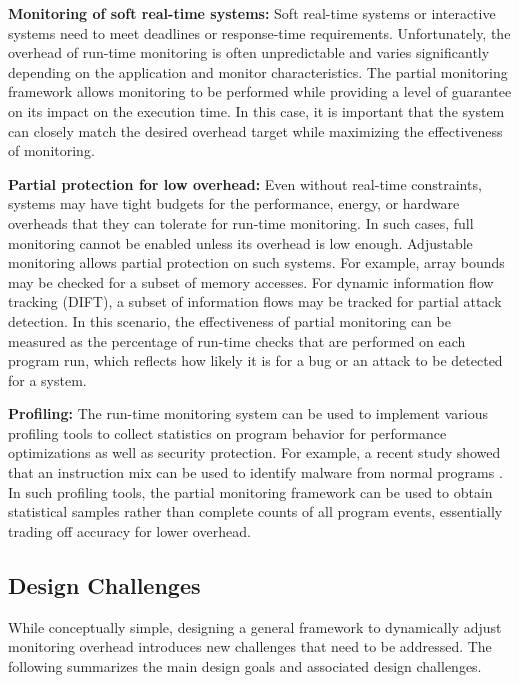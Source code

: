 {\bf Monitoring of soft real-time systems:}
Soft real-time systems or interactive systems need to meet deadlines or
response-time requirements. Unfortunately, the overhead of run-time monitoring
is often unpredictable and varies significantly depending on the application
and monitor characteristics. The partial monitoring framework allows monitoring
to be performed while providing a level of guarantee on its impact on the
execution time.  In this case, it is important that the system can closely
match the desired overhead target while maximizing the effectiveness of
monitoring.

{\bf Partial protection for low overhead:}
Even without real-time constraints, systems may have tight budgets for the
performance, energy, or hardware overheads that they can tolerate for run-time
monitoring. In such cases, full monitoring cannot be enabled unless its
overhead is low enough. Adjustable monitoring allows partial protection on such
systems. For example, array bounds may be checked for a subset of memory
accesses. For dynamic information flow tracking (DIFT), a subset of information
flows may be tracked for partial attack detection. In this scenario, the
effectiveness of partial monitoring can be measured as the percentage of
run-time checks that are performed on each program run, which reflects how
likely it is for a bug or an attack to be detected for a system. 

{\bf Profiling:} 
The run-time monitoring system can be used to implement various profiling tools
to collect statistics on program behavior for performance optimizations as well
as security protection. For example, a recent study showed that an instruction
mix can be used to identify malware from normal programs \cite{demme-isca13,
tang-raid14}.  In such profiling tools, the partial monitoring framework can be
used to obtain statistical samples rather than complete counts of all program
events, essentially trading off accuracy for lower overhead.

\subsection{Design Challenges}

While conceptually simple, designing a general framework to dynamically adjust
monitoring overhead introduces new challenges that need to be addressed.  The
following summarizes the main design goals and associated design challenges.

